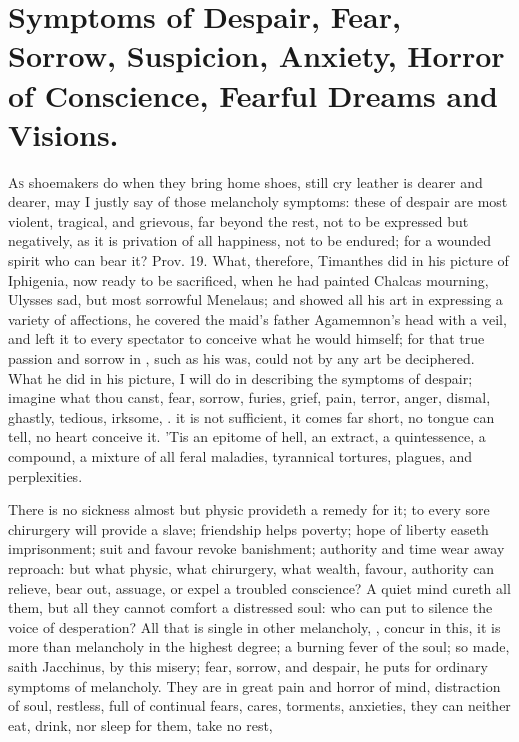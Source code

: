 {\section[Symptoms of Despair]{Symptoms of Despair, Fear, Sorrow, Suspicion, Anxiety, Horror of Conscience, Fearful Dreams and Visions.}

\lettrine{A}{s} shoemakers do when they bring home shoes, still cry leather is
dearer and dearer, may I justly say of those melancholy symptoms: these
of despair are most violent, tragical, and grievous, far beyond the
rest, not to be expressed but negatively, as it is privation of all
happiness, not to be endured; for a wounded spirit who can bear it?
Prov.  19. What, therefore, Timanthes did in his picture of
Iphigenia, now ready to be sacrificed, when he had painted Chalcas
mourning, Ulysses sad, but most sorrowful Menelaus; and showed all his
art in expressing a variety of affections, he covered the maid's father
Agamemnon's head with a veil, and left it to every spectator to
conceive what he would himself; for that true passion and sorrow in
, such as his was, could not by any art be deciphered. What
he did in his picture, I will do in describing the symptoms of despair;
imagine what thou canst, fear, sorrow, furies, grief, pain, terror,
anger, dismal, ghastly, tedious, irksome, \etc{}. it is not sufficient, it
comes far short, no tongue can tell, no heart conceive it. 'Tis an
epitome of hell, an extract, a quintessence, a compound, a mixture of
all feral maladies, tyrannical tortures, plagues, and perplexities.

There is no sickness almost but physic provideth a remedy for it; to
every sore chirurgery will provide a slave; friendship helps poverty;
hope of liberty easeth imprisonment; suit and favour revoke banishment;
authority and time wear away reproach: but what physic, what
chirurgery, what wealth, favour, authority can relieve, bear out,
assuage, or expel a troubled conscience? A quiet mind cureth all them,
but all they cannot comfort a distressed soul: who can put to silence
the voice of desperation? All that is single in other melancholy,
, concur in this, it is more
than melancholy in the highest degree; a burning fever of the soul; so
made, saith Jacchinus, by this misery; fear, sorrow, and despair,
he puts for ordinary symptoms of melancholy. They are in great pain and
horror of mind, distraction of soul, restless, full of continual fears,
cares, torments, anxieties, they can neither eat, drink, nor sleep for
them, take no rest,

}
